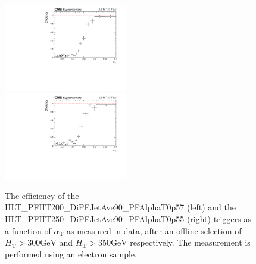 \clearpage
\begin{figure}[tbhp]
    \caption{ 
    The efficiency of the HLT\_PFHT200\_DiPFJetAve90\_PFAlphaT0p57 (left) and the HLT\_PFHT250\_DiPFJetAve90\_PFAlphaT0p55 (right) triggers as a function of $\alpha_{\mathrm{T}}$ as measured in data, 
    after an offline selection of $H_{\mathrm{T}} > 300 \mathrm{GeV}$ and $H_{\mathrm{T}} > 350 \mathrm{GeV}$ respectively. 
    The measurement is performed using an electron sample. 
    \label{fig:trigger-alphaT-turnons} }
  \begin{center}
  \includegraphics[width=0.48\textwidth]{Trigger_HLT_PFHT200_DiPFJetAve90_PFAlphaT0p57_MoM_HT300_alphaT_aux} ~~
  \includegraphics[width=0.48\textwidth]{Trigger_HLT_PFHT250_DiPFJetAve90_PFAlphaT0p55_MoM_HT350_alphaT_aux}  
  \end{center}
\end{figure}



